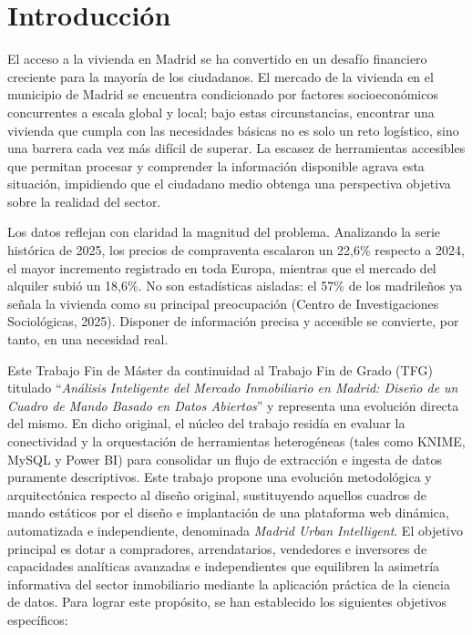 \documentclass[a4paper,11pt,openany]{book}
\begin{document}
\tableofcontents

\mainmatter

\chapter{Introducción}
El acceso a la vivienda en Madrid se ha convertido en un desafío financiero creciente para la mayoría de los ciudadanos. El mercado de la vivienda en el municipio de Madrid se encuentra condicionado por factores socioeconómicos concurrentes a escala global y local; bajo estas circunstancias, encontrar una vivienda que cumpla con las necesidades básicas no es solo un reto logístico, sino una barrera cada vez más difícil de superar. La escasez de herramientas accesibles que permitan procesar y comprender la información disponible agrava esta situación, impidiendo que el ciudadano medio obtenga una perspectiva objetiva sobre la realidad del sector.

Los datos reflejan con claridad la magnitud del problema. Analizando la serie histórica de 2025, los precios de compraventa escalaron un 22,6\% respecto a 2024, el mayor incremento registrado en toda Europa, mientras que el mercado del alquiler subió un 18,6\%. No son estadísticas aisladas: el 57\% de los madrileños ya señala la vivienda como su principal preocupación (Centro de Investigaciones Sociológicas, 2025). Disponer de información precisa y accesible se convierte, por tanto, en una necesidad real.

Este Trabajo Fin de Máster da continuidad al Trabajo Fin de Grado (TFG) titulado ``\textit{Análisis Inteligente del Mercado Inmobiliario en Madrid: Diseño de un Cuadro de Mando Basado en Datos Abiertos}'' y representa una evolución directa del mismo. En dicho original, el núcleo del trabajo residía en evaluar la conectividad y la orquestación de herramientas heterogéneas (tales como KNIME, MySQL y Power BI) para consolidar un flujo de extracción e ingesta de datos puramente descriptivos. Este trabajo propone una evolución metodológica y arquitectónica respecto al diseño original, sustituyendo aquellos cuadros de mando estáticos por el diseño e implantación de una plataforma web dinámica, automatizada e independiente, denominada \textit{Madrid Urban Intelligent}. El objetivo principal es dotar a compradores, arrendatarios, vendedores e inversores de capacidades analíticas avanzadas e independientes que equilibren la asimetría informativa del sector inmobiliario mediante la aplicación práctica de la ciencia de datos. Para lograr este propósito, se han establecido los siguientes objetivos específicos:
\end{document}

